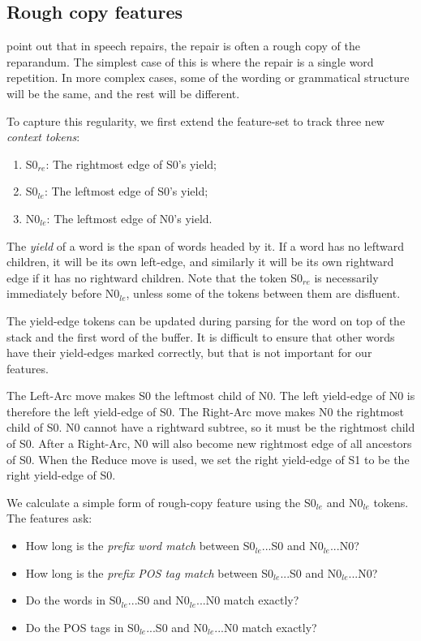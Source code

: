 \documentclass[11pt,letterpaper]{article}
\newcommand{\szero}{S0\xspace}
\newcommand{\nzero}{N0\xspace}
\newcommand{\szeroRedge}{S0$_{re}$\xspace}
\newcommand{\szeroLedge}{S0$_{le}$\xspace}
\newcommand{\nzeroLedge}{N0$_{le}$\xspace}
\begin{document}
\subsection{Rough copy features}

\citet{Johnson04a} point out that in speech repairs, the repair is often a rough
copy of the reparandum.  The simplest case of this is where the repair is a single
word repetition. In more complex cases, some of the wording or grammatical
structure will be the same, and the rest will be different.

To capture this regularity, we first extend the feature-set to track three new
\emph{context tokens}:
\begin{enumerate}
    \item \szeroRedge : The rightmost edge of \szero 's yield;
    \item \szeroLedge : The leftmost edge of \szero 's yield;
    \item \nzeroLedge : The leftmost edge of \nzero 's yield.
\end{enumerate}

The \emph{yield} of a word is the span of words headed by it.  If a word has
no leftward children, it will be its own left-edge, and similarly it will be
its own rightward edge if it has no rightward children. Note that the token
\szeroRedge is necessarily immediately before \nzeroLedge, unless some of the
tokens between them are disfluent.

The yield-edge tokens can be updated during parsing for the word on top of the
stack and the first word of the buffer.
It is difficult to ensure that other words
have their yield-edges marked correctly, but that is not important
for our features.

The Left-Arc move makes \szero the leftmost child of \nzero. The left yield-edge of
\nzero is therefore the left yield-edge of \szero. The Right-Arc move makes \nzero
the rightmost child of \szero. \nzero cannot have a rightward subtree, so it must
be the rightmost child of \szero.  After a Right-Arc, \nzero will also become
new rightmost edge of all ancestors of \szero.  When the Reduce move is used,
we set the right yield-edge of S1 to be the right yield-edge of \szero.

We calculate a simple form of rough-copy feature using the \szeroLedge and
\nzeroLedge tokens.  The features ask:

\begin{itemize}
    \item How long is the \emph{prefix word match} between \szeroLedge...\szero
          and \nzeroLedge...\nzero?
    \item How long is the \emph{prefix POS tag match} between \szeroLedge...\szero
          and \nzeroLedge...\nzero?
    \item Do the words in \szeroLedge...\szero and \nzeroLedge...\nzero match
          exactly?
    \item Do the POS tags in \szeroLedge...\szero and \nzeroLedge...\nzero match
          exactly?
\end{itemize}
\end{document}
